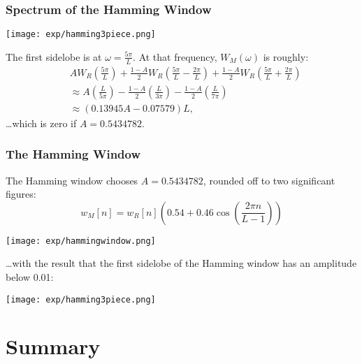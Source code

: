\documentclass{beamer}
\begin{document}
\begin{frame}
  \frametitle{Spectrum of the Hamming Window}

  \begin{center}
    \texttt{[image: exp/hamming3piece.png]}
  \end{center}

  The first sidelobe is at $\omega=\frac{5\pi}{L}$.  At that
  frequency, $W_M\left(\omega\right)$ is roughly:
  \begin{align*}
    &AW_R\left(\frac{5\pi}{L}\right)+ \frac{1-A}{2}W_R\left(\frac{5\pi}{L}-\frac{2\pi}{L}\right)+
    \frac{1-A}{2}W_R\left(\frac{5\pi}{L}+\frac{2\pi}{L}\right)\\
    &\approx A\left(\frac{L}{5\pi}\right) - \frac{1-A}{2}\left(\frac{L}{3\pi}\right)
    -\frac{1-A}{2}\left(\frac{L}{7\pi}\right)\\
    & \approx \left(0.13945 A-0.07579\right)L,
  \end{align*}
  \ldots which is zero if $A=0.5434782$.
\end{frame}

\begin{frame}
  \frametitle{The Hamming Window}

  The Hamming window chooses $A=0.5434782$, rounded off to two significant figures:
  \begin{displaymath}
    w_M[n] = w_R[n]\left(0.54 + 0.46\cos\left(\frac{2\pi n}{L-1}\right)\right)
  \end{displaymath}
  \centerline{\texttt{[image: exp/hammingwindow.png]}}
  \ldots with the result that the first sidelobe of the Hamming window
  has an amplitude below 0.01:
  \begin{center}
    \texttt{[image: exp/hamming3piece.png]}
  \end{center}
\end{frame}

\section[Summary]{Summary}
\setcounter{subsection}{1}
\end{document}
